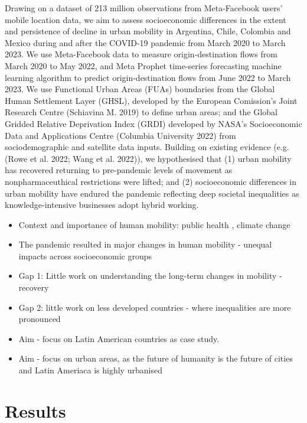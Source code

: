 \documentclass[
  11pt,
]{article}
\providecommand{\tightlist}{%
  \setlength{\itemsep}{0pt}\setlength{\parskip}{0pt}}\usepackage{longtable,booktabs,array}
\begin{document}
Drawing on a dataset of 213 million observations from Meta-Facebook
users' mobile location data, we aim to assess socioeconomic differences
in the extent and persistence of decline in urban mobility in Argentina,
Chile, Colombia and Mexico during and after the COVID-19 pandemic from
March 2020 to March 2023. We use Meta-Facebook data to measure
origin-destination flows from March 2020 to May 2022, and Meta Prophet
time-series forecasting machine learning algorithm to predict
origin-destination flows from June 2022 to March 2023. We use Functional
Urban Areas (FUAs) boundaries from the Global Human Settlement Layer
(GHSL), developed by the European Comission's Joint Research Centre
(Schiavina M. 2019) to define urban areas; and the Global Gridded
Relative Deprivation Index (GRDI) developed by NASA's Socioeconomic Data
and Applications Centre (Columbia University 2022) from sociodemographic
and satellite data inputs. Building on existing evidence (e.g. (Rowe et
al. 2022; Wang et al. 2022)), we hypothesised that (1) urban mobility
has recovered returning to pre-pandemic levels of movement as
nonpharmaceuthical restrictions were lifted; and (2) socioeconomic
differences in urban mobility have endured the pandemic reflecting deep
societal inequalities as knowledge-intensive businesses adopt hybrid
working.

\begin{itemize}
\tightlist
\item
  Context and importance of human mobility: public health , climate
  change\\
\item
  The pandemic resulted in major changes in human mobility - unequal
  impacts across socioeconomic groups\\
\item
  Gap 1: Little work on understanding the long-term changes in mobility
  - recovery\\
\item
  Gap 2: little work on less developed countries - where inequalities
  are more pronounced\\
\item
  Aim - focus on Latin American countries as case study.
\item
  Aim - focus on urban areas, as the future of humanity is the future of
  cities and Latin Ameriaca is highly urbanised
\end{itemize}

\section{Results}\label{sec-results}
\end{document}
